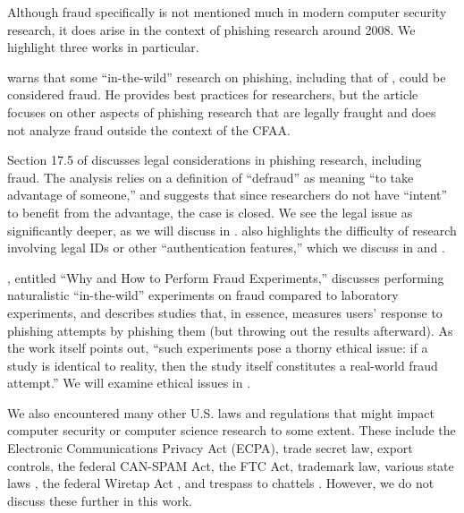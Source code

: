 \label{sec:related-fraud}
Although fraud specifically is not mentioned much in modern computer security research, it does arise in the context of phishing research around 2008.  We highlight three works in particular.


\cite{soghoian2008legal} warns that some ``in-the-wild'' research on phishing, including that of \cite{jakobssonWhyHowPerform2008}, could be considered fraud. He provides best practices for researchers, but the article focuses on other aspects of phishing research that are legally fraught and does not analyze fraud outside the context of the CFAA.

Section 17.5 of \cite{phishing-book} discusses legal considerations in phishing research, including fraud. The analysis relies on a definition of ``defraud'' as meaning ``to take advantage of someone,'' and suggests that since researchers do not have ``intent'' to benefit from the advantage, the case is closed.  We see the legal issue as significantly deeper, as we will discuss in . \cite{phishing-book} also highlights the difficulty of research involving legal IDs or other ``authentication features,'' which we discuss in  and .

\cite{jakobssonWhyHowPerform2008}, entitled ``Why and How to Perform Fraud Experiments,'' discusses performing naturalistic ``in-the-wild'' experiments on fraud compared to laboratory experiments, and describes studies that, in essence, measures users' response to phishing attempts by phishing them (but throwing out the results afterward).  As the work itself points out, ``such experiments pose a thorny ethical issue: if a study is identical to reality, then the study itself constitutes a real-world fraud attempt.''  We will examine ethical issues in .


We also encountered many other U.S. laws and regulations that might impact computer security or computer science research to some extent.  These include
the Electronic Communications Privacy Act (ECPA), trade secret law, export controls, \cite{parkResearchersGuideLegal}
the federal CAN-SPAM Act, the FTC Act, \cite{phishing-book}
trademark law, various state laws \cite{phishing-book,soghoian2008legal}, the federal Wiretap Act \cite{ohmLegalIssuesSurrounding2007}, and
trespass to chattels \cite{soghoian2008legal}.
However, we do not discuss these further in this work.

